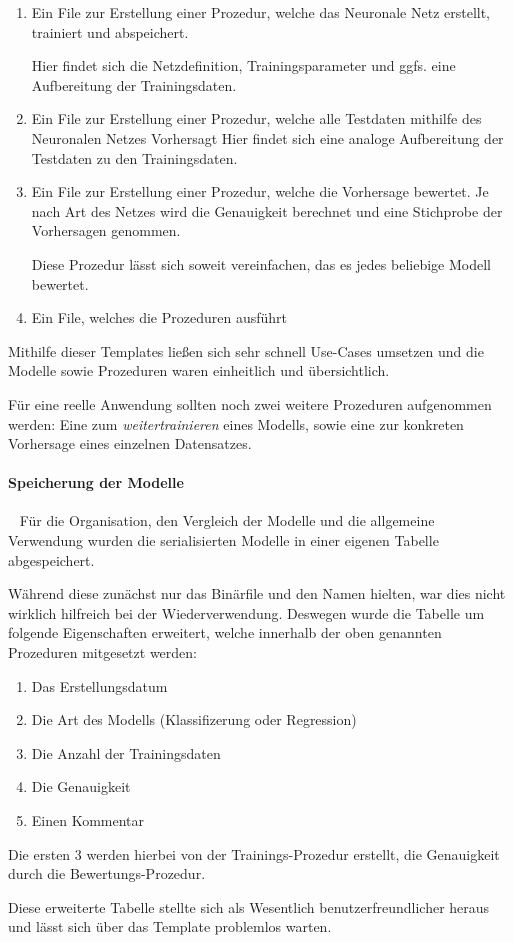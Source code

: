 \begin{enumerate}
	\item Ein File zur Erstellung einer Prozedur, welche das Neuronale Netz erstellt, trainiert und abspeichert.
	
	Hier findet sich die Netzdefinition, Trainingsparameter und ggfs. eine Aufbereitung der Trainingsdaten.
	\item Ein File zur Erstellung einer Prozedur, welche alle Testdaten mithilfe des Neuronalen Netzes Vorhersagt
	Hier findet sich eine analoge Aufbereitung der Testdaten zu den Trainingsdaten.
	\item Ein File zur Erstellung einer Prozedur, welche die Vorhersage bewertet. Je nach Art des Netzes wird die Genauigkeit berechnet und eine Stichprobe der Vorhersagen genommen.
	
	Diese Prozedur lässt sich soweit vereinfachen, das es jedes beliebige Modell bewertet.
	\item Ein File, welches die Prozeduren ausführt
\end{enumerate}

Mithilfe dieser Templates ließen sich sehr schnell Use-Cases umsetzen und die Modelle sowie Prozeduren waren einheitlich und übersichtlich. 

Für eine reelle Anwendung sollten noch zwei weitere Prozeduren aufgenommen werden: Eine zum \textit{weitertrainieren} eines Modells, sowie eine zur konkreten Vorhersage eines einzelnen Datensatzes. 

\paragraph{Speicherung der Modelle} ~\newline
Für die Organisation, den Vergleich der Modelle und die allgemeine Verwendung wurden die serialisierten Modelle in einer eigenen Tabelle abgespeichert. 

Während diese zunächst nur das Binärfile und den Namen hielten, war dies nicht wirklich hilfreich bei der Wiederverwendung. Deswegen wurde die Tabelle um folgende Eigenschaften erweitert, welche innerhalb der oben genannten Prozeduren mitgesetzt werden:

\begin{enumerate}
	\item Das Erstellungsdatum
	\item Die Art des Modells (Klassifizerung oder Regression)
	\item Die Anzahl der Trainingsdaten
	\item Die Genauigkeit
	\item Einen Kommentar
\end{enumerate}

Die ersten 3 werden hierbei von der Trainings-Prozedur erstellt, die Genauigkeit durch die Bewertungs-Prozedur.

Diese erweiterte Tabelle stellte sich als Wesentlich benutzerfreundlicher heraus und lässt sich über das Template problemlos warten.